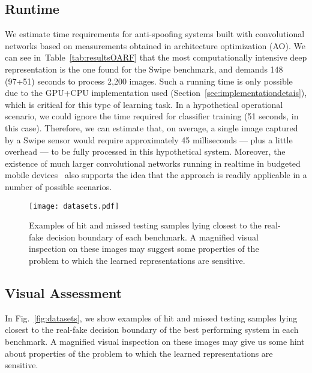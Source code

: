 \subsection{Runtime}

We estimate time requirements for anti-spoofing systems built with convolutional networks based on measurements obtained in architecture optimization (AO).
We can see in~Table~\ref{tab:resultsOARF} that the most computationally intensive deep representation is the one found for the Swipe benchmark, and demands 148 (97+51) seconds to process 2,200 images. Such a running time is only possible due to the GPU+CPU implementation used (Section~\ref{sec:implementationdetais}), which is critical for this type of learning task. In a hypothetical operational scenario, we could ignore the time required for classifier training (51 seconds, in this case). Therefore, we can estimate that, on average, a single image captured by a Swipe sensor would require approximately 45 milliseconds --- plus a little overhead --- to be fully processed in this hypothetical system. Moreover, the existence of much larger convolutional networks running in realtime in budgeted mobile devices~\cite{Wardern:2014} also supports the idea that the approach is readily applicable in a number of possible scenarios.


\begin{figure*}[!t]
\begin{center}
\texttt{[image: datasets.pdf]}
\caption{Examples of hit and missed testing samples lying closest to the real-fake decision boundary of each benchmark. A magnified visual inspection on these images may suggest some properties of the problem to which the learned representations are sensitive.}
\label{fig:datasets}\label{page:fig:datasets}
\end{center}
\end{figure*}


\subsection{Visual Assessment}

In Fig.~\ref{fig:datasets}, we show examples of hit and missed testing samples lying closest to the real-fake decision boundary of the best performing system in each benchmark. 
A magnified visual inspection on these images may give us some hint about properties of the problem to which the learned representations are sensitive.

